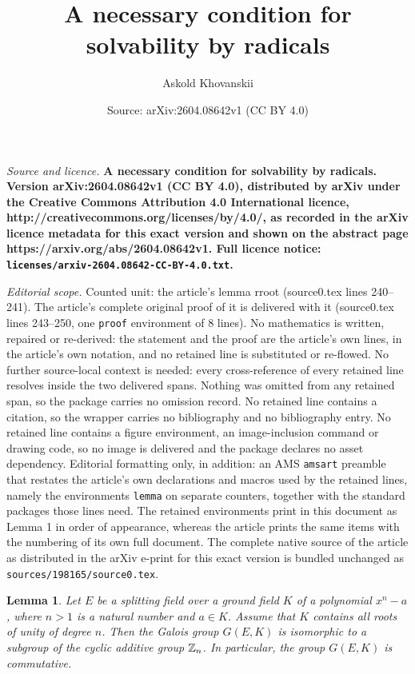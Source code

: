 \documentclass[10pt,a4paper]{amsart}
\title{\bf {A necessary condition for solvability by radicals}}
\author{Askold Khovanskii}
\date{Source: arXiv:2604.08642v1 (CC BY 4.0)}
\newtheorem{lemma}{Lemma}
\begin{document}
\maketitle

\noindent\emph{Source and licence.} \bf {A necessary condition for solvability by radicals}. Version arXiv:2604.08642v1 (CC BY 4.0), distributed by arXiv under the Creative Commons Attribution 4.0 International licence, http://creativecommons.org/licenses/by/4.0/, as recorded in the arXiv licence metadata for this exact version and shown on the abstract page https://arxiv.org/abs/2604.08642v1. Full licence notice: \texttt{licenses/arxiv-2604.08642-CC-BY-4.0.txt}.\par\smallskip

\noindent\textit{Editorial scope.} Counted unit: the article's lemma rroot (source0.tex lines 240--241). The article's complete original proof of it is delivered with it (source0.tex lines 243--250, one \texttt{proof} environment of 8 lines). No mathematics is written, repaired or re-derived: the statement and the proof are the article's own lines, in the article's own notation, and no retained line is substituted or re-flowed.  No further source-local context is needed: every cross-reference of every retained line resolves inside the two delivered spans.  Nothing was omitted from any retained span, so the package carries no omission record.  No retained line contains a citation, so the wrapper carries no bibliography and no bibliography entry.  No retained line contains a figure environment, an image-inclusion command or drawing code, so no image is delivered and the package declares no asset dependency.  Editorial formatting only, in addition: an AMS \texttt{amsart} preamble that restates the article's own declarations and macros used by the retained lines, namely the environments \texttt{lemma} on separate counters, together with the standard packages those lines need.  The retained environments print in this document as Lemma 1 in order of appearance, whereas the article prints the same items with the numbering of its own full document.  The complete native source of the article as distributed in the arXiv e-print for this exact version is bundled unchanged as \texttt{sources/198165/source0.tex}.
\begin{lemma}\label{rroot} Let $E$ be a splitting field over a ground field $K$ of a polynomial $x^n-a$, where $n>1$  is a natural number and $a\in K$. Assume that $K$ contains all roots of unity of degree $n$.  Then the Galois group $G(E,K)$ is isomorphic to a subgroup of  the cyclic additive group $\Bbb Z_n$. In particular, the group $G(E,K)$ is commutative.
\end{lemma}
\end{document}
